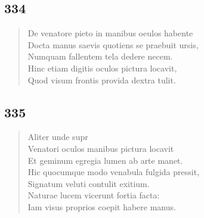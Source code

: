 \documentclass[11pt, a4paper]{report}
\begin{document}
            \subsection*{334}
      \begin{verse}
      De venatore pieto in manibus oeulos habente \\ Docta manus saevis quotiens se praebuit ursis, \\ Numquam fallentem tela dedere necem. \\ Hinc etiam digitis oculos pictura locavit, \\ Quod visum frontis provida dextra tulit. \\ 
      \end{verse}
  
            \subsection*{335}
      \begin{verse}
      Aliter unde supr \\ Venatori oculos manibus pictura locavit \\ Et geminum egregia lumen ab arte manet. \\ Hic quocumque modo venabula fulgida pressit, \\ Signatum veluti contulit exitium. \\ Naturae lucem vicerunt fortia facta: \\ Iam visus proprios coepit habere manus. \\ 
      \end{verse}
  
\end{document}
